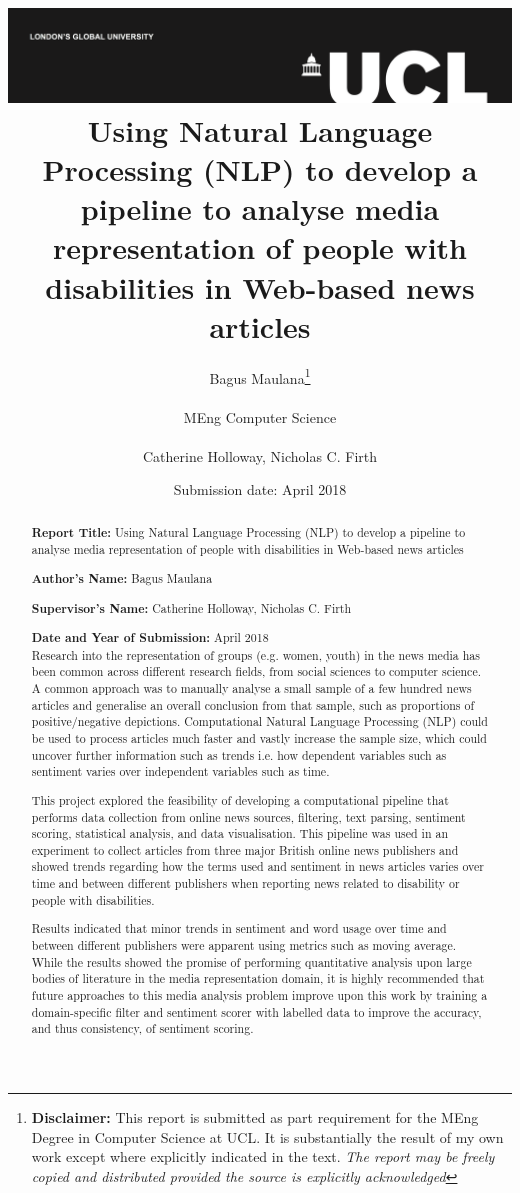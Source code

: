 \documentclass{report}
\title{{\vspace{-14em} \includegraphics[scale=0.4]{ucl_logo.png}}\\
{{\Huge Using Natural Language Processing (NLP) to develop a pipeline to analyse media representation of people with disabilities in Web-based news articles}}\\
}
\date{Submission date: \nth{30} April 2018}
\author{Bagus Maulana\thanks{
{\bf Disclaimer:}
This report is submitted as part requirement for the MEng Degree in Computer Science at UCL. It is
substantially the result of my own work except where explicitly indicated in the text.
\emph{The report may be freely copied and distributed provided the source is explicitly acknowledged}}
\\ \\
MEng Computer Science\\ \\
Catherine Holloway, Nicholas C. Firth}
\begin{document}
 
\onehalfspacing
\maketitle
\begin{abstract}

\textbf{Report Title:}  Using Natural Language Processing (NLP) to develop a pipeline to analyse media representation of people with disabilities in Web-based news articles

\textbf{Author’s Name:} Bagus Maulana

\textbf{Supervisor’s Name:} Catherine Holloway, Nicholas C. Firth

\textbf{Date and Year of Submission:}  April 2018\\

Research into the representation of groups (e.g. women, youth) in the news media has been common across different research fields, from social sciences to computer science.
A common approach was to manually analyse a small sample of a few hundred news articles and generalise an overall conclusion from that sample, such as proportions of positive/negative depictions.
Computational Natural Language Processing (NLP) could be used to process articles much faster and vastly increase the sample size, which could uncover further information such as trends i.e. how dependent variables such as sentiment varies over independent variables such as time.

This project explored the feasibility of developing a computational pipeline that performs data collection from online news sources, filtering, text parsing, sentiment scoring, statistical analysis, and data visualisation.
This pipeline was used in an experiment to collect articles from three major British online news publishers and showed trends regarding how the terms used and sentiment in news articles varies over time and between different publishers when reporting news related to disability or people with disabilities.

Results indicated that minor trends in sentiment and word usage over time and between different publishers were apparent using metrics such as moving average.  
While the results showed the promise of performing quantitative analysis upon large bodies of literature in the media representation domain, it is highly recommended that future approaches to this media analysis problem improve upon this work by training a domain-specific filter and sentiment scorer with labelled data to improve the accuracy, and thus consistency, of sentiment scoring.

\end{abstract}
\tableofcontents
\setcounter{page}{1}
\end{document}
